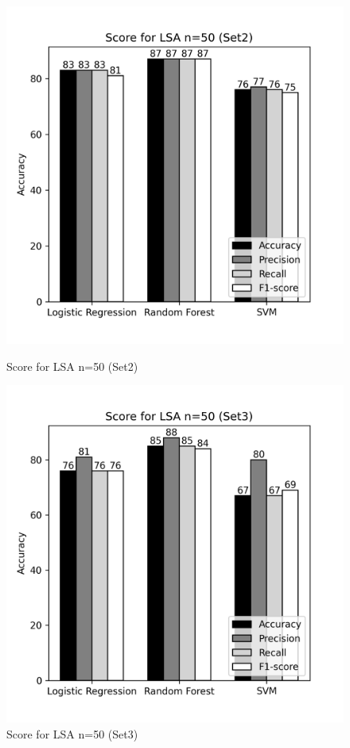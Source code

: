 \documentclass[12pt]{report}
\begin{document}
             \begin{figure}[!htb]
                \begin{minipage}{0.48\textwidth}
                  \centering
                  \includegraphics[scale=0.55]{plots/Score for LSA n=50 (Set2).png}
                  \caption{Score for LSA n=50 (Set2)}\label{Fig:typo1}
                \end{minipage}\hfill
                \begin{minipage}{0.48\textwidth}
                  \centering
                  \includegraphics[scale=0.55]{plots/Score for LSA n=50 (Set3).png}
                  \caption{Score for LSA n=50 (Set3)}\label{Fig:typo2}
                \end{minipage}
             \end{figure}
\end{document}
